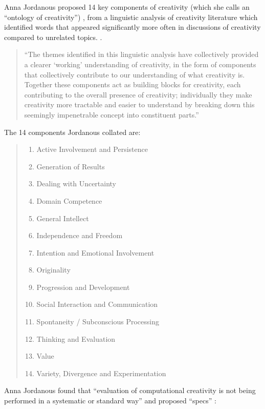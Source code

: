 \spirals

Anna Jordanous proposed 14 key components of creativity (which she calls an  ``ontology of creativity'') \citeyear[p.104-120]{Jordanous2012}, from a linguistic analysis of creativity literature which identified words that appeared significantly more often in discussions of creativity compared to unrelated topics. \citeyear[p.120]{Jordanous2012}.

\begin{quotation}
  ``The themes identified in this linguistic analysis have collectively provided a clearer `working' understanding of creativity, in the form of components that collectively contribute to our understanding of what creativity is. Together these components act as building blocks for creativity, each contributing to the overall presence of creativity; individually they make creativity more tractable and easier to understand by breaking down this seemingly impenetrable concept into constituent parts.'' 
\end{quotation}

The 14 components Jordanous collated are: \citeyear[p.118-120]{Jordanous2012}
\begin{quotation}
  \begin{enumerate}
    \item Active Involvement and Persistence
    \item Generation of Results
    \item Dealing with Uncertainty
    \item Domain Competence
    \item General Intellect
    \item Independence and Freedom
    \item Intention and Emotional Involvement
    \item Originality
    \item Progression and Development
    \item Social Interaction and Communication
    \item Spontaneity / Subconscious Processing
    \item Thinking and Evaluation
    \item Value
    \item Variety, Divergence and Experimentation
  \end{enumerate}
\end{quotation}

Anna Jordanous found that ``evaluation of computational creativity is not being performed in a systematic or standard way'' \autocite[p.2]{Jordanous2011} and proposed ``\gls{specs}'' \autocite[p.137-140]{Jordanous2012a}:
\label{s:specs}

